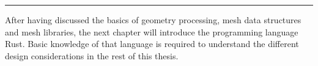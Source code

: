 \setlength{\tabcolsep}{\origtabcolsep}

\vfill

\begin{center}
\rule{.8\textwidth}{.15mm}
\end{center}

After having discussed the basics of geometry processing, mesh data structures and mesh libraries, the next chapter will introduce the programming language Rust.
Basic knowledge of that language is required to understand the different design considerations in the rest of this thesis.

